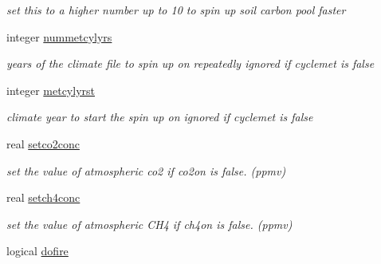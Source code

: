 \begin{DoxyCompactItemize}
\begin{DoxyCompactList}\small\item\em set this to a higher number up to 10 to spin up soil carbon pool faster \end{DoxyCompactList}\item 
\hypertarget{structctem__statevars_1_1ctem__switches_a43203dfbedec802203a53ae29512f449}{}integer \hyperlink{structctem__statevars_1_1ctem__switches_a43203dfbedec802203a53ae29512f449}{nummetcylyrs}\label{structctem__statevars_1_1ctem__switches_a43203dfbedec802203a53ae29512f449}

\begin{DoxyCompactList}\small\item\em years of the climate file to spin up on repeatedly ignored if cyclemet is false \end{DoxyCompactList}\item 
\hypertarget{structctem__statevars_1_1ctem__switches_a36ccc2a74464b7b353c65199e0b5a261}{}integer \hyperlink{structctem__statevars_1_1ctem__switches_a36ccc2a74464b7b353c65199e0b5a261}{metcylyrst}\label{structctem__statevars_1_1ctem__switches_a36ccc2a74464b7b353c65199e0b5a261}

\begin{DoxyCompactList}\small\item\em climate year to start the spin up on ignored if cyclemet is false \end{DoxyCompactList}\item 
\hypertarget{structctem__statevars_1_1ctem__switches_af788a560567ecd8122bc1b727505b87d}{}real \hyperlink{structctem__statevars_1_1ctem__switches_af788a560567ecd8122bc1b727505b87d}{setco2conc}\label{structctem__statevars_1_1ctem__switches_af788a560567ecd8122bc1b727505b87d}

\begin{DoxyCompactList}\small\item\em set the value of atmospheric co2 if co2on is false. (ppmv) \end{DoxyCompactList}\item 
\hypertarget{structctem__statevars_1_1ctem__switches_a60c462f31d7e50b17759f0cad55ffd3e}{}real \hyperlink{structctem__statevars_1_1ctem__switches_a60c462f31d7e50b17759f0cad55ffd3e}{setch4conc}\label{structctem__statevars_1_1ctem__switches_a60c462f31d7e50b17759f0cad55ffd3e}

\begin{DoxyCompactList}\small\item\em set the value of atmospheric C\+H4 if ch4on is false. (ppmv) \end{DoxyCompactList}\item 
\hypertarget{structctem__statevars_1_1ctem__switches_acd44b6d02549e9b4605b67e9d677c53a}{}logical \hyperlink{structctem__statevars_1_1ctem__switches_acd44b6d02549e9b4605b67e9d677c53a}{dofire}\label{structctem__statevars_1_1ctem__switches_acd44b6d02549e9b4605b67e9d677c53a}


\end{DoxyCompactItemize}
